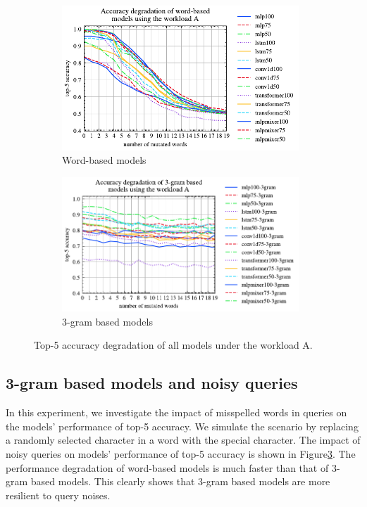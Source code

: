 \documentclass[conference]{IEEEtran}
\begin{document}
\begin{figure}[h]
	\centering
	\begin{subfigure}{0.45\textwidth}
		\includegraphics[width=3.5in]{graphics/acc_degradation_word_based_A.pdf}
		\caption{Word-based models}
		\label{fig:acc_degradation_workload_A_word_based}
	\end{subfigure}
	\begin{subfigure}{0.45\textwidth}
		\includegraphics[width=3.5in]{graphics/acc_degradation_3gram_based_A.pdf}
		\caption{3-gram based models}
		\label{fig:acc_degradation_workload_A_3gram}
	\end{subfigure}
	\caption{Top-5 accuracy degradation of all models under the workload A.}
	\label{fig:noisy-queries}
\end{figure}

\subsection{3-gram based models and noisy queries}
In this experiment, we investigate the impact of misspelled words in queries on the models' performance of top-5 accuracy. We simulate the scenario by replacing a randomly selected character in a word with the special character.  The impact of noisy queries on models' performance of top-5 accuracy is shown in Figure\ref{fig:noisy-queries}. The performance degradation of word-based models is much faster than that of 3-gram based models. This clearly shows that 3-gram based models are more resilient to query noises.
\end{document}
